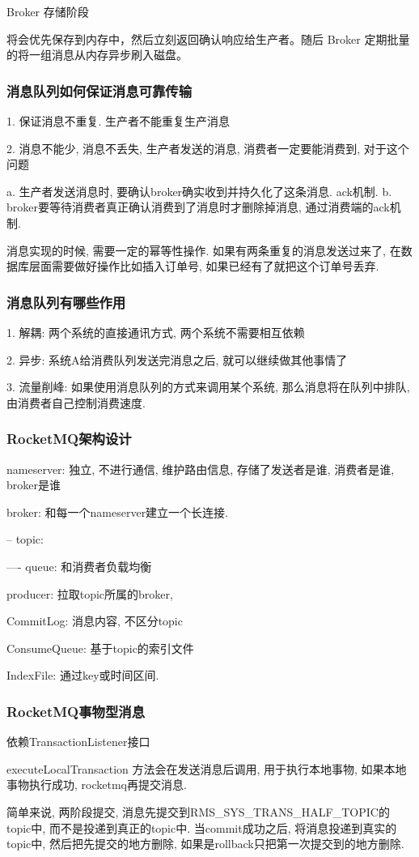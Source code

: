 Broker 存储阶段

将会优先保存到内存中，然后立刻返回确认响应给生产者。随后 Broker 定期批量的将一组消息从内存异步刷入磁盘。

\subsubsection{消息队列如何保证消息可靠传输}

1. 保证消息不重复. 生产者不能重复生产消息

2. 消息不能少, 消息不丢失, 生产者发送的消息, 消费者一定要能消费到, 对于这个问题

a. 生产者发送消息时, 要确认broker确实收到并持久化了这条消息. ack机制.
b. broker要等待消费者真正确认消费到了消息时才删除掉消息, 通过消费端的ack机制.

消息实现的时候, 需要一定的幂等性操作. 如果有两条重复的消息发送过来了, 在数据库层面需要做好操作比如插入订单号, 如果已经有了就把这个订单号丢弃.

\subsubsection{消息队列有哪些作用}

1. 解耦: 两个系统的直接通讯方式, 两个系统不需要相互依赖

2. 异步: 系统A给消费队列发送完消息之后, 就可以继续做其他事情了

3. 流量削峰: 如果使用消息队列的方式来调用某个系统, 那么消息将在队列中排队, 由消费者自己控制消费速度.

\subsubsection{RocketMQ架构设计}
nameserver: 独立, 不进行通信, 维护路由信息, 存储了发送者是谁, 消费者是谁, broker是谁


broker: 和每一个nameserver建立一个长连接.

-- topic:

---- queue: 和消费者负载均衡

producer: 拉取topic所属的broker,

CommitLog: 消息内容, 不区分topic

ConsumeQueue: 基于topic的索引文件

IndexFile: 通过key或时间区间.
\subsubsection{RocketMQ事物型消息}
依赖TransactionListener接口

executeLocalTransaction 方法会在发送消息后调用, 用于执行本地事物, 如果本地事物执行成功, rocketmq再提交消息.

简单来说, 两阶段提交, 消息先提交到RMS\_SYS\_TRANS\_HALF\_TOPIC的topic中, 而不是投递到真正的topic中. 当commit成功之后, 将消息投递到真实的topic中, 然后把先提交的地方删除, 如果是rollback只把第一次提交到的地方删除.
